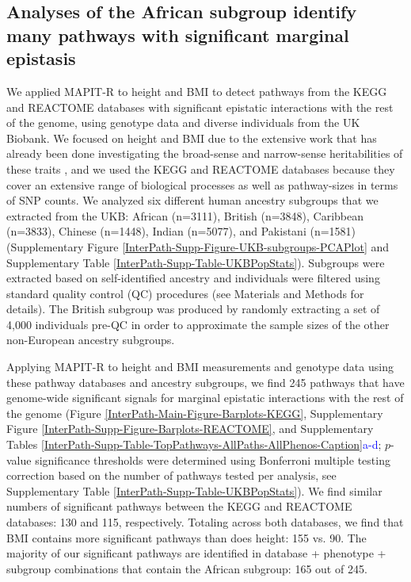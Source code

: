 \documentclass[12pt,a4paper]{article}
\begin{document}
\subsection{Analyses of the African subgroup identify many pathways with significant marginal epistasis}\label{InterPath-Results-PathwayEpistasis}

We applied MAPIT-R to height and BMI to detect pathways from the KEGG and REACTOME databases \citep{Liberzon2011} with significant epistatic interactions with the rest of the genome, using genotype data and diverse individuals from the UK Biobank. We focused on height and BMI due to the extensive work that has already been done investigating the broad-sense and narrow-sense heritabilities of these traits \citep{Yang2010,Elks2012,Visscher2012,Finucane2015,Speed2017,Wainschtein2019}, and we used the KEGG and REACTOME databases because they cover an extensive range of biological processes as well as pathway-sizes in terms of SNP counts. We analyzed six different human ancestry subgroups that we extracted from the UKB: African (n=3111), British (n=3848), Caribbean (n=3833), Chinese (n=1448), Indian (n=5077), and Pakistani (n=1581) (Supplementary Figure \ref{InterPath-Supp-Figure-UKB-subgroups-PCAPlot} and Supplementary Table \ref{InterPath-Supp-Table-UKBPopStats}). Subgroups were extracted based on self-identified ancestry and individuals were filtered using standard quality control (QC) procedures (see Materials and Methods for details). The British subgroup was produced by randomly extracting a set of 4,000 individuals pre-QC in order to approximate the sample sizes of the other non-European ancestry subgroups.

Applying MAPIT-R to height and BMI measurements and genotype data using these pathway databases and ancestry subgroups, we find 245 pathways that have genome-wide significant signals for marginal epistatic interactions with the rest of the genome (Figure \ref{InterPath-Main-Figure-Barplots-KEGG}, Supplementary Figure \ref{InterPath-Supp-Figure-Barplots-REACTOME}, and Supplementary Tables \ref{InterPath-Supp-Table-TopPathways-AllPaths-AllPhenos-Caption}\textcolor{blue}{a-d}; $p$-value significance thresholds were determined using Bonferroni multiple testing correction based on the number of pathways tested per analysis, see Supplementary Table \ref{InterPath-Supp-Table-UKBPopStats}). We find similar numbers of significant pathways between the KEGG and REACTOME databases: 130 and 115, respectively. Totaling across both databases, we find that BMI contains more significant pathways than does height: 155 vs. 90. The majority of our significant pathways are identified in database + phenotype + subgroup combinations that contain the African subgroup: 165 out of 245.
\end{document}
